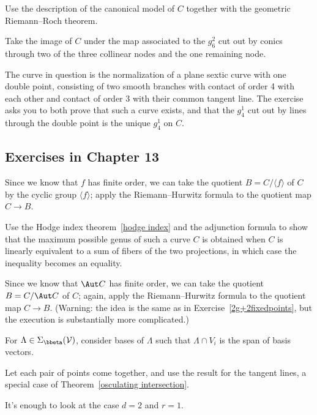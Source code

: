 Use the description of the canonical model of $C$ 
together with the geometric
Riemann--Roch theorem.
%
%

Take the image of $C$ under the map associated to the $g^2_6$
cut out by conics through two of the three collinear nodes and the one
remaining node.

The curve in question is the normalization of a plane sextic curve
with one double point, consisting of two smooth branches with contact of
order 4 with each other and contact of order 3 with their common tangent
line. The exercise asks you to both prove that such a curve exists,
and that the $g^1_4$ cut out by lines through the double point is the
unique $g^1_4$ on $C$.

\subsection*{Exercises in Chapter 13}

Since we know that $f$ has finite order, we can take the quotient
$B = C/\langle f \rangle$ of $C$ by the cyclic group $\langle f \rangle$;
apply
the Riemann--Hurwitz formula
%
to the quotient map $C \to B$.

Use the Hodge index theorem~\ref{hodge index} and the adjunction
%
%
formula to show that the maximum possible genus of such
a curve $C$ is obtained when $C$ is linearly equivalent to a sum of
fibers of the two projections, in which case the inequality
becomes an equality.

 Since we know that $\Aut C$ has finite order, we can take
the quotient $B = C/\Aut C$ of $C$; again, apply
the Riemann--Hurwitz formula
%
%
to the quotient map $C \to B$. (Warning: the idea is the same as in
Exercise~\ref{2g+2fixedpoints}, but the execution is substantially
more complicated.)

For $\Lambda \in \Sigma_{\bbeta}({\cal V})$, consider bases of
$\Lambda$ such that $\Lambda \cap V_i$ is the span of basis vectors.

Let each pair of points come together, and use the result
for the tangent lines, a special case of Theorem~\ref{osculating
intersection}.

It's enough to look at the case $d=2$ and $r=1$.

